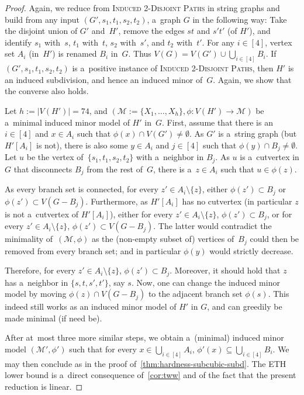 \documentclass[a4paper,UKenglish,cleveref,autoref]{lipics-v2021}
\begin{document}
\begin{proof}
  Again, we reduce from \textsc{Induced 2-Disjoint Paths} in string graphs and build from any input $(G', s_1, t_1, s_2, t_2)$, a~graph $G$ in the following way:
  Take the disjoint union of $G'$ and~$H'$, remove the edges $st$ and $s't'$ (of $H'$), and identify $s_1$ with~$s$, $t_1$ with~$t$, $s_2$ with~$s'$, and $t_2$ with~$t'$.
  For any $i \in [4]$, vertex set $A_i$ (in~$H'$) is renamed $B_i$ in~$G$.
  Thus $V(G) = V(G') \cup \bigcup_{i \in [4]} B_i$.
  If $(G', s_1, t_1, s_2, t_2)$ is a~positive instance of \textsc{Induced 2-Disjoint Paths}, then $H'$ is an induced subdivision, and hence an induced minor of~$G$.
  Again, we show that the converse also holds.

  Let $h := |V(H')| = 74$, and $(\mathcal M := \{X_1, \ldots, X_h\}, \phi: V(H') \to \mathcal M)$ be a~minimal induced minor model of $H'$ in~$G$.
First, assume that there is an~$i \in [4]$ and $x \in A_i$ such that $\phi(x) \cap V(G') \neq \emptyset$.
  As $G'$ is a~string graph (but $H'[A_i]$ is not), there is also some $y \in A_i$ and $j \in [4]$ such that $\phi(y) \cap B_j \neq \emptyset$.
  Let $u$ be the vertex of~$\{s_1, t_1, s_2, t_2\}$ with a~neighbor in $B_j$.
  As $u$ is a~cutvertex in $G$ that disconnects $B_j$ from the rest of~$G$, there is a~$z \in A_i$ such that $u \in \phi(z)$.

  As every branch set is connected, for every $z' \in A_i \setminus \{z\}$, either $\phi(z') \subset B_j$ or $\phi(z') \subset V(G-B_j)$.
  Furthermore, as $H'[A_i]$ has no cutvertex (in particular $z$ is not a~cutvertex of $H'[A_i]$), either for every $z' \in A_i \setminus \{z\}$, $\phi(z') \subset B_j$, or for every $z' \in A_i \setminus \{z\}$, $\phi(z') \subset V(G-B_j)$.
  The latter would contradict the minimality of~$(\mathcal M, \phi)$ as the (non-empty subset of) vertices of~$B_j$ could then be removed from every branch set; and in particular $\phi(y)$ would strictly decrease.

  Therefore, for every $z' \in A_i \setminus \{z\}$, $\phi(z') \subset B_j$.
  Moreover, it should hold that $z$ has a~neighbor in $\{s,t,s',t'\}$, say $s$.
  Now, one can change the induced minor model by moving $\phi(z) \cap V(G-B_j)$ to the adjacent branch set $\phi(s)$.
  This indeed still works as an induced minor model of $H'$ in $G$, and can greedily be made minimal (if need be).

  After at~most three more similar steps, we obtain a~(minimal) induced minor model $(\mathcal M', \phi')$ such that for every $x \in \bigcup_{i \in [4]} A_i$, $\phi'(x) \subseteq \bigcup_{i \in [4]} B_i$.
  We may then conclude as in the proof of~\cref{thm:hardness-subcubic-subd}.
  The ETH lower bound is a~direct consequence of~\cref{cor:tww} and of the fact that the present reduction is linear.
\end{proof}
\end{document}
